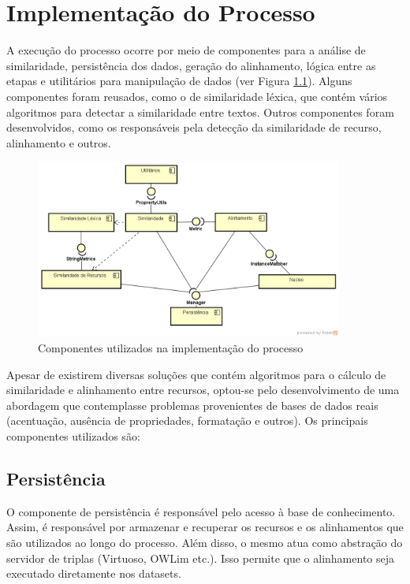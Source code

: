 \chapter{Implementação do Processo}

A execução do processo ocorre por meio de componentes para a análise de similaridade, persistência dos dados, geração do alinhamento, lógica entre as etapas e utilitários para manipulação de dados (ver Figura \ref{fig:componentes}). Alguns componentes foram reusados, como o de similaridade léxica, que contém vários algoritmos para detectar a similaridade entre textos. Outros componentes foram desenvolvidos, como os responsáveis pela detecção da similaridade de recurso, alinhamento e outros.

\begin{figure}[!ht]
	\centering
	\includegraphics[width=0.9\textwidth]{./imagens/componentes.png}
    \caption{Componentes utilizados na implementação do processo}
	\label{fig:componentes}
\end{figure}

Apesar de existirem diversas soluções que contém algoritmos para o cálculo de similaridade e alinhamento entre recursos, optou-se pelo desenvolvimento de uma abordagem que contemplasse problemas provenientes de bases de dados reais (acentuação, ausência de propriedades, formatação e outros).
Os principais componentes utilizados são:

\section{Persistência}
O componente de persistência é responsável pelo acesso à base de conhecimento. Assim, é responsável por armazenar e recuperar os recursos e os alinhamentos que são utilizados ao longo do processo. Além disso, o mesmo atua como abstração do servidor de triplas (Virtuoso, OWLim etc.). Isso permite que o alinhamento seja executado diretamente nos datasets.

